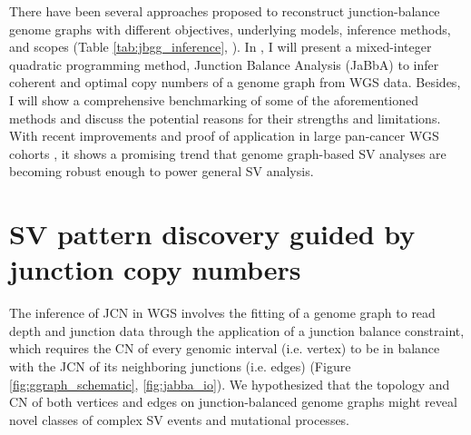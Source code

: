 \documentclass[phd,tocprelim]{cornell}
\begin{document}
There have been several approaches proposed to reconstruct junction-balance genome graphs with different objectives, underlying models, inference methods, and scopes (Table \ref{tab:jbgg_inference}, \cite{Oesper2012-vw,McPherson2017-ry,Li2016-qa,Dzamba2017-wo,Deshpande2019-gs,Li2020-ds,Lee2021-rl,Aganezov2019-yh}). In , I will present a mixed-integer quadratic programming method, Junction Balance Analysis (JaBbA) to infer coherent and optimal copy numbers of a genome graph from WGS data. Besides, I will show a comprehensive benchmarking of some of the aforementioned methods and discuss the potential reasons for their strengths and limitations. With recent improvements and proof of application in large pan-cancer WGS cohorts \cite{Hadi2020-um}, it shows a promising trend that genome graph-based SV analyses are becoming robust enough to power general SV analysis.

\section{SV pattern discovery guided by junction copy numbers}

The inference of JCN in WGS involves the fitting of a genome graph to read depth and junction data through the application of a junction balance constraint, which requires the CN of every genomic interval (i.e. vertex) to be in balance with the JCN of its neighboring junctions (i.e. edges) (Figure \ref{fig:ggraph_schematic}, \ref{fig:jabba_io})\cite{Medvedev:2010bm, Greenman:2012eg, Oesper2012-vw, Li2016-qa, Dzamba2017-wo, McPherson2017-ry}. We hypothesized that the topology and CN of both vertices and edges on junction-balanced genome graphs might reveal novel classes of complex SV events and mutational processes. 
\end{document}
